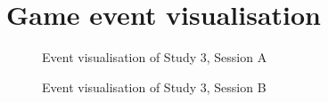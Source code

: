 \section{Game event visualisation}\label{app:vis3}
\begin{figure}[H]
  \centering
  \caption{Event visualisation of Study 3, Session A}
\end{figure}

\begin{figure}[H]
  \centering
  \caption{Event visualisation of Study 3, Session B}
\end{figure}